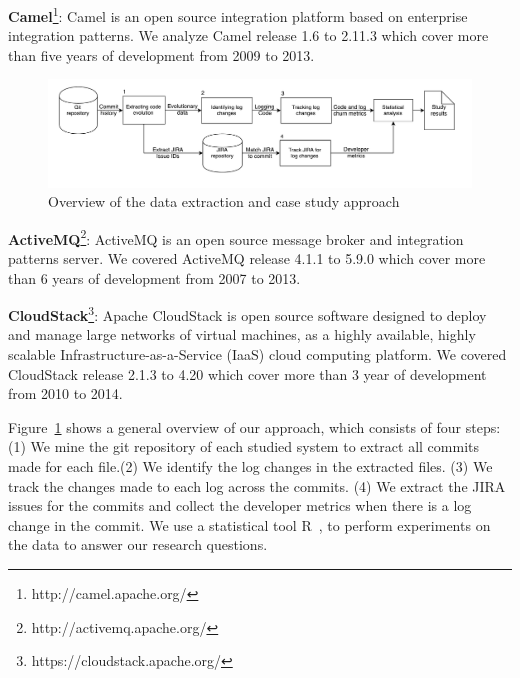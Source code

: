 

\textbf{Camel}\footnote[2]{http://camel.apache.org/}: Camel is an open source integration platform based on enterprise integration patterns. We analyze Camel release 1.6 to 2.11.3 which cover more than five years of development from 2009 to 2013. 
\begin{figure}
	\centering
	\includegraphics[width=1.7\columnwidth,height=0.50\columnwidth]{LogGenalogyMethdology}
	\caption{Overview of the data extraction and case study approach}
	\label{fig:LGmethod}
\end{figure}



\textbf{ActiveMQ}\footnote[3]{http://activemq.apache.org/}: ActiveMQ is an open source message broker and integration patterns server. We covered ActiveMQ release 4.1.1 to 5.9.0 which cover more than 6 years of development from 2007 to 2013.


\textbf{CloudStack}\footnote[4]{https://cloudstack.apache.org/}: Apache CloudStack is open source software designed to deploy and manage large networks of virtual machines, as a highly available, highly scalable Infrastructure-as-a-Service (IaaS) cloud computing platform. We covered CloudStack release 2.1.3 to 4.20 which cover more than 3 year of development from 2010 to 2014.


Figure~\ref{fig:LGmethod} shows a general overview of our approach, which consists of four steps: (1) We mine the git repository of each studied system to extract all commits made for each file.(2) We identify the log changes in the extracted files. (3) We track the changes made to each log across the commits. (4) We extract the JIRA issues for the commits and collect the developer metrics when there is a log change in the commit.  We use a statistical tool R~\cite{ihaka1996r}, to perform experiments on the data to answer our research questions. 

